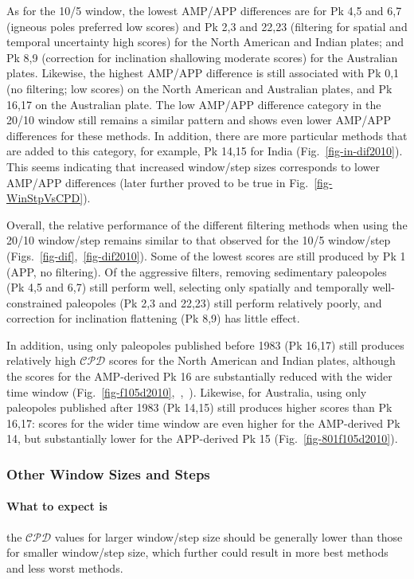 As for the 10/5 window, the lowest AMP/APP differences are for Pk 4,5 and 6,7
(igneous poles preferred \textendash{} low scores) and Pk 2,3 and 22,23
(filtering for spatial and temporal uncertainty \textendash{} high scores) for
the North American and Indian plates; and Pk 8,9 (correction for inclination
shallowing \textendash{} moderate scores) for the Australian plates. Likewise,
the highest AMP/APP difference is still associated with Pk 0,1 (no filtering;
low scores) on the North American and Australian plates, and Pk 16,17 on the
Australian plate. The low AMP/APP difference category in the 20/10 window still
remains a similar pattern and shows even lower AMP/APP differences for these
methods. In addition, there are more particular methods that are added to this
category, for example, Pk 14,15 for India (Fig.~\ref{fig-in-dif2010}). This
seems indicating that increased window/step sizes corresponds to lower AMP/APP
differences (later further proved to be true in Fig.~\ref{fig-WinStpVsCPD}).

Overall, the relative performance of the different filtering methods when using
the 20/10 window/step remains similar to that observed for the 10/5 window/step
(Figs.~\ref{fig-dif},~\ref{fig-dif2010}). Some of the lowest scores are still
produced by Pk 1 (APP, no filtering). Of the aggressive filters, removing
sedimentary paleopoles (Pk 4,5 and 6,7) still perform well, selecting only
spatially and temporally well-constrained paleopoles (Pk 2,3 and 22,23) still
perform relatively poorly, and correction for inclination flattening (Pk 8,9)
has little effect.

In addition, using only paleopoles published before 1983 (Pk 16,17) still
produces relatively high $\mathcal{CPD}$ scores for the North American and
Indian plates, although the scores for the AMP-derived Pk 16 are substantially
reduced with the wider time window
(Fig.~\ref{fig-f105d2010},~,~).
Likewise, for Australia, using only paleopoles published after 1983 (Pk 14,15)
still produces higher scores than Pk 16,17: scores for the wider time window are
even higher for the AMP-derived Pk 14, but substantially lower for the
APP-derived Pk 15 (Fig.~\ref{fig-801f105d2010}).

\subsubsection{Other Window Sizes and Steps}

\paragraph{What to expect is}
the $\mathcal{CPD}$ values for larger window/step size should be generally lower
than those for smaller window/step size, which further could result in more best
methods and less worst methods.

